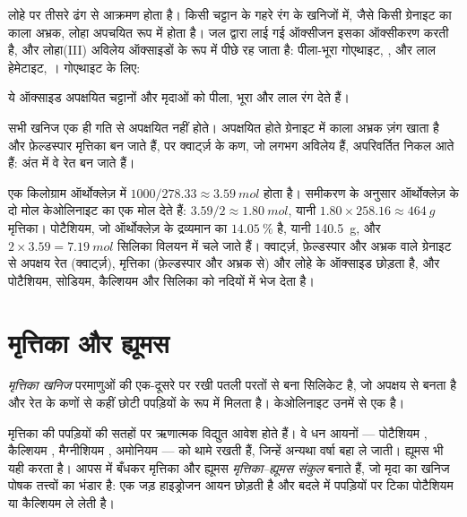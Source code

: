 लोहे पर तीसरे ढंग से आक्रमण होता है। किसी चट्टान के गहरे रंग के खनिजों में, जैसे
किसी ग्रेनाइट का काला अभ्रक, लोहा अपचयित रूप  में होता है। जल द्वारा लाई गई
ऑक्सीजन इसका ऑक्सीकरण करती है, और लोहा(III) अविलेय
ऑक्साइडों के रूप में पीछे रह जाता है: पीला-भूरा गोएथाइट, , और लाल हेमेटाइट,
। गोएथाइट के लिए:
\begin{center}
\end{center}
ये ऑक्साइड अपक्षयित चट्टानों और मृदाओं को पीला, भूरा और लाल रंग देते हैं।

सभी खनिज एक ही गति से अपक्षयित नहीं होते। अपक्षयित होते ग्रेनाइट में काला
अभ्रक ज़ंग खाता है और फ़ेल्डस्पार मृत्तिका बन जाते हैं, पर क्वार्ट्ज़ के कण, जो लगभग
अविलेय हैं, अपरिवर्तित निकल आते हैं: अंत में वे रेत बन जाते हैं।

\begin{example}[ग्रेनाइट का अपक्षय]\label{ex:g10:soil-formation:granite}
एक किलोग्राम ऑर्थोक्लेज़ में $1000/278.33 \approx \qty{3.59}{mol}$
 होता है। समीकरण के अनुसार ऑर्थोक्लेज़ के दो मोल
केओलिनाइट का एक मोल देते हैं: $3.59/2 \approx \qty{1.80}{mol}$, यानी $1.80 \times 258.16
\approx \qty{464}{g}$ मृत्तिका। पोटैशियम, जो ऑर्थोक्लेज़ के द्रव्यमान का $14.05~\%$ है,
यानी \qty{140.5}{g}, और $2 \times 3.59 = \qty{7.19}{mol}$ सिलिका
विलयन में चले जाते हैं। क्वार्ट्ज़, फ़ेल्डस्पार और अभ्रक वाले ग्रेनाइट से अपक्षय
रेत (क्वार्ट्ज़), मृत्तिका (फ़ेल्डस्पार और अभ्रक से) और लोहे के ऑक्साइड छोड़ता है,
और पोटैशियम, सोडियम, कैल्शियम और सिलिका को नदियों में भेज देता है।
\end{example}

\section{मृत्तिका और ह्यूमस}

\begin{definition}[मृत्तिका खनिज]\label{def:g10:soil-formation:clay}
\emph{मृत्तिका खनिज} परमाणुओं की एक-दूसरे पर रखी पतली
परतों से बना सिलिकेट है, जो अपक्षय से बनता है और रेत के कणों से कहीं छोटी
पपड़ियों के रूप में मिलता है। केओलिनाइट उनमें से एक है।
\end{definition}

मृत्तिका की पपड़ियों की सतहों पर ऋणात्मक विद्युत आवेश होते हैं। वे
धन आयनों --- पोटैशियम , कैल्शियम , मैग्नीशियम
, अमोनियम  --- को थामे रखती हैं, जिन्हें अन्यथा
वर्षा बहा ले जाती। ह्यूमस भी यही करता है। आपस में बँधकर मृत्तिका और ह्यूमस
\emph{मृत्तिका--ह्यूमस संकुल} बनाते हैं, जो मृदा का खनिज पोषक तत्त्वों का भंडार है: एक जड़
हाइड्रोजन आयन छोड़ती है और बदले में पपड़ियों पर टिका पोटैशियम या कैल्शियम
ले लेती है।


